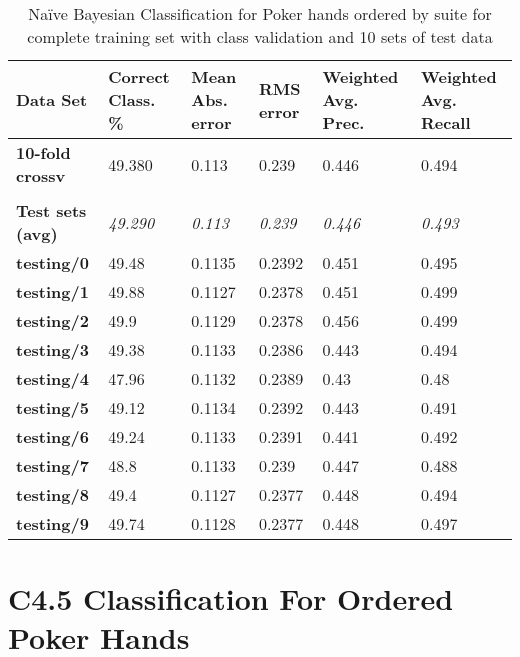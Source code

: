 \documentclass[10pt, a4paper]{article}
\begin{document}
\begin{table}[htbp]
  \centering
  \begin{tabular}{p{3cm}p{1.5cm}p{1.5cm}p{1.5cm}p{1.5cm}p{1.5cm}}
    \toprule
    \textbf{Data Set} & Correct Class. \% & Mean Abs. error & RMS error & Weighted Avg. Prec. & Weighted Avg. Recall \\
    \midrule
    \textbf{10-fold crossv} & 49.380 & 0.113 & 0.239 & 0.446 & 0.494 \\
    \textbf{} &       &       &       &       &  \\
    \textbf{Test sets (avg)} & \textit{49.290} & \textit{0.113} & \textit{0.239} & \textit{0.446} & \textit{0.493} \\
    \textbf{   testing/0} & 49.48 & 0.1135 & 0.2392 & 0.451 & 0.495 \\
    \textbf{   testing/1} & 49.88 & 0.1127 & 0.2378 & 0.451 & 0.499 \\
    \textbf{   testing/2} & 49.9  & 0.1129 & 0.2378 & 0.456 & 0.499 \\
    \textbf{   testing/3} & 49.38 & 0.1133 & 0.2386 & 0.443 & 0.494 \\
    \textbf{   testing/4} & 47.96 & 0.1132 & 0.2389 & 0.43  & 0.48 \\
    \textbf{   testing/5} & 49.12 & 0.1134 & 0.2392 & 0.443 & 0.491 \\
    \textbf{   testing/6} & 49.24 & 0.1133 & 0.2391 & 0.441 & 0.492 \\
    \textbf{   testing/7} & 48.8  & 0.1133 & 0.239 & 0.447 & 0.488 \\
    \textbf{   testing/8} & 49.4  & 0.1127 & 0.2377 & 0.448 & 0.494 \\
    \textbf{   testing/9} & 49.74 & 0.1128 & 0.2377 & 0.448 & 0.497 \\
    \bottomrule
    \end{tabular}%

	\caption{Na\"ive Bayesian Classification for Poker hands ordered by suite for complete training set with class validation and 10 sets of test data}   
  \label{tab:nnosresults}%
\end{table}%


\clearpage

\section{C4.5 Classification For Ordered Poker Hands}
\end{document}
